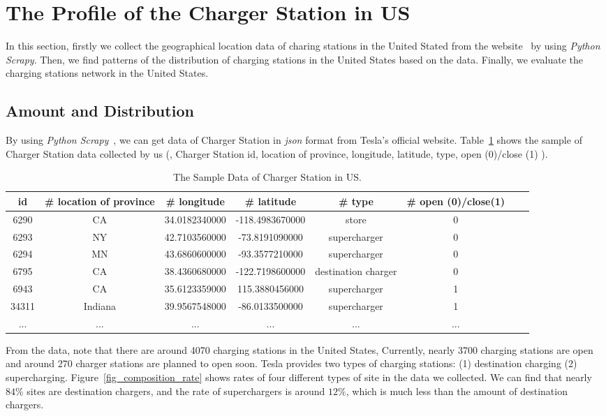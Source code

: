 \section{The Profile of the Charger Station in US}
\label{sec_profile_us}
In this section, firstly we collect the geographical location data of charing stations in the United Stated from the website~\cite{ChargerStationData} by using \emph{Python Scrapy}.
Then, we find patterns of the distribution of charging stations in the United States based on the data.
Finally, we evaluate the charging stations network in the United States.
\subsection{Amount and Distribution}
By using \emph{Python Scrapy}~\cite{PythonScrapy},
we can get data of Charger Station in \emph{json} format from Tesla's official website.
Table~\ref{table_sample_data} shows the sample of Charger Station data collected by us (\eg, Charger Station id, location of province, longitude, latitude, type, open (0)/close (1) ).
\begin{table}[h]
\centering
\small{
\caption{\textnormal{The Sample Data of Charger Station in US.}}
\label{table_sample_data}
}
\begin{tabular}{c c c c c c c c }
\toprule
id & \# location of province & \# longitude & \# latitude & \# type &\# open (0)/close(1) \\ \midrule
6290 & CA & 34.0182340000 & -118.4983670000 & store & 0 \\
6293 & NY & 42.7103560000 & -73.8191090000 & supercharger & 0 \\
6294 & MN & 43.6860600000 & -93.3577210000 & supercharger & 0 \\
6795 & CA & 38.4360680000 & -122.7198600000 & destination charger & 0 \\
6943 & CA & 35.6123359000 & 115.3880456000 & supercharger & 1 \\
34311 & Indiana & 39.9567548000 & -86.0133500000 & supercharger & 1 \\
... & ... & ... & ... & ... & ...\\
\bottomrule
\end{tabular}
\end{table}

From the data, note that there are around 4070 charging stations in the United States,
Currently, nearly 3700 charging stations are open and around 270 charger stations are planned to open soon.
Tesla provides two types of charging stations: (1) destination charging (2) supercharging.
Figure~\ref{fig_composition_rate} shows rates of four different types of site in the data we collected.
We can find that nearly $84\%$ sites are destination chargers,
and the rate of superchargers is around $12\%$, which is much less than the amount of destination chargers.

